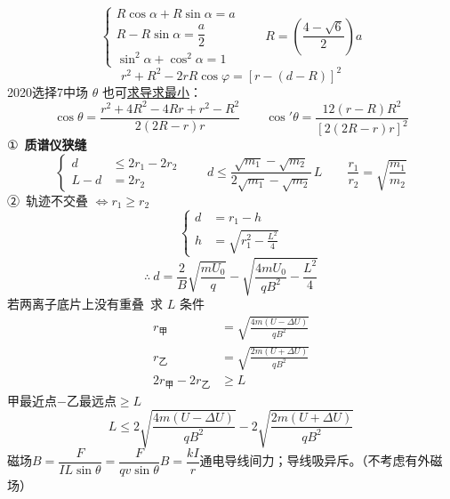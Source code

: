 \[ \begin{cases} R\cos\alpha+R\sin\alpha=a\\ R-R\sin\alpha=\dfrac a2\\ \sin^2\alpha+\cos^2\alpha=1\end{cases}\qquad R=\left(\dfrac{4-\sqrt6}{2}\right)a \]
\[ r^2+R^2-2rR\cos\varphi=\left[r-(d-R)\right]^2 \]
2020选择7中场 $\theta$ 也可\underline{求导求最小}：
\[
\cos\theta=\frac{r^{2}+4R^{2}-4Rr+r^{2}-R^{2}}{2(2R-r)r}\qquad
\cos'\theta=\frac{12(r-R)R^{2}}{[2(2R-r)r]^{2}}
\]
①\ \textbf{质谱仪狭缝}
\[
\left\{\begin{aligned}
d&\le 2r_{1}-2r_{2}\\
L-d&=2r_{2}
\end{aligned}\right.
\qquad d\le\frac{\sqrt{m_{1}}-\sqrt{m_{2}}}{2\sqrt{m_{1}}-\sqrt{m_{2}}}\,L
\qquad \frac{r_{1}}{r_{2}}=\sqrt{\frac{m_{1}}{m_{2}}}
\]
②\ 轨迹不交叠 $\Leftrightarrow r_{1}\ge r_{2}$
\[
\left\{\begin{aligned}
d&=r_{1}-h\\
h&=\sqrt{r_{1}^{2}-\frac{L^{2}}{4}}
\end{aligned}\right.
\]
\[
\therefore\ d=\frac{2}{B}\sqrt{\frac{mU_{0}}{q}}-\sqrt{\frac{4mU_{0}}{qB^{2}}-\frac{L^{2}}{4}}
\]
若两离子底片上没有重叠\ 求 $L$ 条件
\begin{align*}
r_{\text{甲}}&=\sqrt{\frac{4m(U-\Delta U)}{qB^{2}}}\\
r_{\text{乙}}&=\sqrt{\frac{2m(U+\Delta U)}{qB^{2}}}\\
2r_{\text{甲}}-2r_{\text{乙}}&\ge L
\end{align*}
甲最近点$-$乙最远点$\ge L$
\[
L\le2\sqrt{\frac{4m(U-\Delta U)}{qB^{2}}}-2\sqrt{\frac{2m(U+\Delta U)}{qB^{2}}}
\]
磁场\quad $B=\dfrac{F}{IL\sin\theta}=\dfrac{F}{qv\sin\theta}$\qquad $B=\dfrac{kI}{r}$\quad 通电导线间力；导线吸异斥。（不考虑有外磁场）

